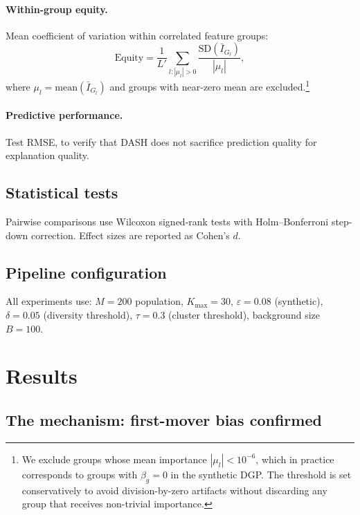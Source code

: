 \documentclass[11pt]{article}
\newcommand{\dash}{\textsc{DASH}}
\begin{document}
\paragraph{Within-group equity.}
Mean coefficient of variation within correlated feature groups:
\begin{equation}
  \text{Equity} = \frac{1}{L'} \sum_{l : |\mu_l| > 0}
    \frac{\text{SD}(\bar{I}_{G_l})}{|\mu_l|},
\end{equation}
where $\mu_l = \text{mean}(\bar{I}_{G_l})$ and groups with near-zero
mean are excluded.\footnote{We exclude groups whose mean importance
$|\mu_l| < 10^{-6}$, which in practice corresponds to groups with
$\beta_g = 0$ in the synthetic DGP. The threshold is set conservatively
to avoid division-by-zero artifacts without discarding any group that
receives non-trivial importance.}

\paragraph{Predictive performance.}
Test RMSE, to verify that \dash{} does not sacrifice prediction quality
for explanation quality.

\subsection{Statistical tests}

Pairwise comparisons use Wilcoxon signed-rank tests with Holm--Bonferroni
step-down correction. Effect sizes are reported as Cohen's $d$.

\subsection{Pipeline configuration}

All experiments use: $M = 200$ population, $K_{\max} = 30$,
$\varepsilon = 0.08$ (synthetic), $\delta = 0.05$ (diversity threshold),
$\tau = 0.3$ (cluster threshold), background size $B = 100$.


\section{Results}
\label{sec:results}

\subsection{The mechanism: first-mover bias confirmed}
\label{sec:mechanism_result}
\end{document}
